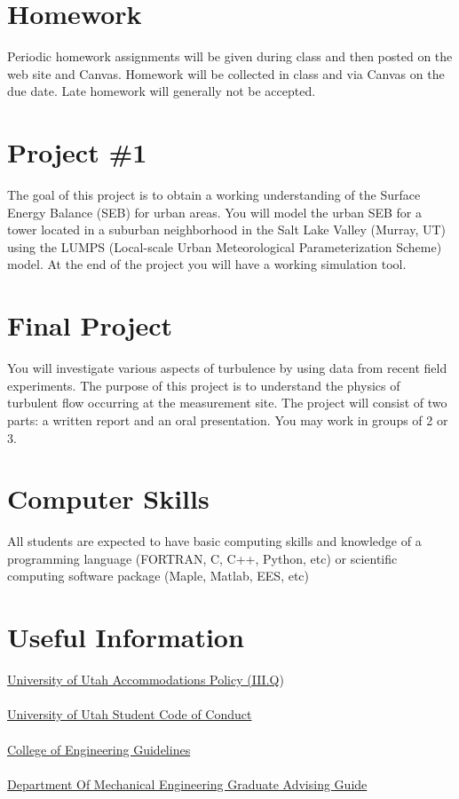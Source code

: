 \documentclass[11pt]{article}
\theoremstyle{mytheor}
\begin{document}
\section*{Homework}
Periodic homework assignments will be given during class and then posted on the web site and Canvas.  Homework will be collected in class and via Canvas on the due date. Late homework will generally not be accepted.

\section*{Project \#1}
The goal of this project is to obtain a working understanding of the Surface Energy Balance (SEB) for urban areas. You will model the urban SEB for a tower located in a suburban neighborhood in the Salt Lake Valley (Murray, UT) using the LUMPS (Local-scale Urban Meteorological Parameterization Scheme) model. At the end of the project you will have a working simulation tool.

\section*{Final Project}
You will investigate various aspects of turbulence by using data from recent field experiments. The purpose of this project is to understand the physics of turbulent flow occurring at the measurement site. The project will consist of two parts: a written report and an oral presentation. You may work in groups of 2 or 3.

\section*{Computer Skills}
All students are expected to have basic computing skills and knowledge of a programming language (FORTRAN, C, C++, Python, etc) or scientific computing software package (Maple, Matlab, EES, etc)

\section*{Useful Information}
\href{http://regulations.utah.edu/academics/6-100.php}{University of Utah Accommodations Policy (III.Q})\\\\
\href{http://regulations.utah.edu/academics/6-400.php}{University of Utah Student Code of Conduct}\\\\
\href{http://www.coe.utah.edu/wp-content/uploads/pdf/faculty/semester_guidelines.pdf}{College of Engineering Guidelines}\\\\
\href{https://mech.utah.edu/files/2016/06/Grad-Handbook-AY-2015-20161.pdf}{Department Of Mechanical Engineering Graduate Advising Guide}
\end{document}
